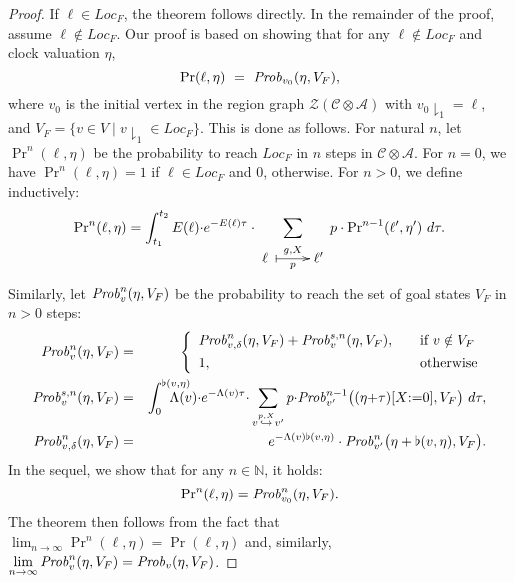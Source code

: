 \documentclass{LMCS}
\makeatletter
\newcommand{\mc}[1]{\mathcal{#1}}
\newcommand{\<}{\langle}
\renewcommand{\>}{\rangle}
\newcommand{\Prob}{{\it Prob}}
\newcommand{\Nats}{\mathbb{N}}
\newcommand{\updownmapsto}[4]{\xymatrix{#1\;\ar @{|->}[r]^{#2}_{#3}&#4}}
\makeatother
\begin{document}
\begin{proof}
If $\ell\in Loc_F$, the theorem follows directly.  In the remainder of the proof, assume
$\ell\notin Loc_F$.  Our proof is based on showing that for any $\ell\notin Loc_F$ and
clock valuation $\eta$,
\begin{equation}\label{eq:unbpres}
\Pr(\ell,\eta) \ = \ {\Prob}_{v_0}(\eta,V_F),
\end{equation}
where $v_0$ is the initial vertex in the region graph $\mc{Z}(\mc{C} \otimes
\mc{A})$ with $v_0{\downharpoonright_1} = \ell$, and $V_F = \{ v \in V \mid
v{\downharpoonright_1} \in Loc_F \}$.
This is done as follows.
For natural $n$, let ${\Pr}^n(\ell,\eta)$ be the probability to reach $Loc_F$ in $n$
steps in $\mc{C} \otimes \mc{A}$.
For $n=0$, we have ${\Pr}^n(\ell,\eta) = 1$ if $\ell \in Loc_F$ and 0, otherwise.
For $n > 0$, we define inductively:
\begin{equation*}
{\Pr}^{n}(\ell,\eta) =
\int_{t_1}^{t_2} E(\ell){\cdot}e^{-E(\ell)\tau} \cdot
\sum_{\updownmapsto{\ell}{g,X}{p}{\ell'}} p \cdot {\Pr}^{n{-}1}(\ell',\eta')\ d\tau.
\end{equation*}
Similarly, let $\Prob_v^{n}(\eta, V_F)$ be the probability to reach the set of goal states
$V_F$ in $n > 0$ steps:
\begin{eqnarray}
\Prob_v^n(\eta,V_F)&=&
\left\{\begin{array}{ll}\Prob_{v,\delta}^n(\eta,V_F)+{\Prob}_{v}
^{s,n}(\eta,V_F), &\quad
\mbox{if } v\notin V_F \\[1ex]
1,& \quad \mbox{otherwise}
\end{array}\right.\\
{\Prob}_{v}^{s,n}(\eta,V_F)&=&
\int_0^{\flat(v,\eta)}\hspace{-0.6cm}\Lambda(v) {\cdot}
e^{-\Lambda(v)\tau}{\cdot}\sum_{v\stackrel{p,
X}{\hookrightarrow}v'}p{\cdot}{\Prob}_{v'}^{n-1}\big((\eta{+}\tau)[X{:=}0],V_F
\big)\ d\tau,\\
{\Prob}_{v,\delta}^n(\eta,V_F)&=&e^{-\Lambda(v)\flat(v,
\eta)}\cdot{\Prob}_{v'}^n\big(\eta+\flat(v,\eta),V_F\big).\label{eq:prob_n_v_delta}
\end{eqnarray}
In the sequel, we show that for any $n\in\Nats$, it holds:
\begin{equation}\label{eq:unbpresind}
{\Pr}^{n}(\ell,\eta) = \Prob_{v_0}^{n}(\eta,V_F).
\end{equation}
The theorem then follows from the fact that $\displaystyle
\lim_{n\to\infty}{\Pr}^{n}(\ell,\eta)={\Pr}(\ell,\eta)$ and, similarly,
$\displaystyle \lim_{n\to\infty}\Prob_v^{n}(\eta,V_F)=\Prob_v(\eta,V_F)$.


\end{proof}
\end{document}
